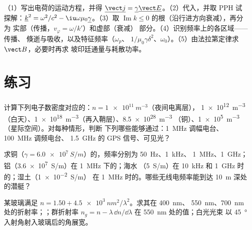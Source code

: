 \begin{method}[介质中的波]\label{met:b2:waves-in-media:method}
（1）写出电荷的运动方程，并得 $\underline{\vect j} =
\underline\gamma\underline{\vect E}$。（2）代入，并取 PPH
试探解：$\underline k^2 = \omega^2/c^2 - \iu\omega\mu_0\underline\gamma$。（3）取
$\operatorname{Im}k \le 0$ 的根（沿行进方向衰减），再分为
实部（传播，$v_\varphi = \omega/k'$）和虚部（衰减）
部分。（4）识别频率上的各区域——传播、
倏逝与吸收，以及特征频率（$\omega_p$、
$1/\mu_0\gamma\delta^2$、$\omega_0$）。（5）由法拉第定律求 $\vect B$，必要时再求
坡印廷通量与耗散功率。
\end{method}

\section{练习}

\begin{exercise}[$\star$]\label{exo:b2:waves-in-media:1}
计算下列电子数密度对应的：$n = \qty{1e11}{m^{-3}}$（夜间电离层），
\qty{1e12}{m^{-3}}（白天）、\qty{1e18}{m^{-3}}（再入鞘层）、\qty{8.5e28}{m^{-3}}
（铜）、\qty{1e5}{m^{-3}}（星际空间）。对每种情形，判断
下列哪些能够通过：\qty{1}{MHz} 调幅电台、\qty{100}{MHz} 调频电台、
\qty{1.5}{GHz} 的 GPS 信号、可见光？
\end{exercise}

\begin{exercise}[$\star$]\label{exo:b2:waves-in-media:2}
求铜（$\gamma = \qty{6.0e7}{S/m}$）的，频率分别为 \qty{50}{Hz}、\qty{1}{kHz}、
\qty{1}{MHz}、\qty{1}{GHz}；铝（\qty{3.6e7}{S/m}）在 \qty{1}{MHz} 下的；海水
（\qty{5}{S/m}）在 \qty{10}{kHz} 和 \qty{1}{GHz} 时的；湿土（\qty{1e-2}{S/m}）
在 \qty{1}{MHz} 时的。哪些无线电频率能到达 \qty{10}{m} 深处的潜艇？
\end{exercise}

\begin{exercise}[$\star$]\label{exo:b2:waves-in-media:3}
某玻璃满足 $n = 1.50 + \qty{4.5e3}{nm^2}/\lambda^2$。求其在 \qty{400}{nm}、
\qty{550}{nm}、\qty{700}{nm} 处的折射率；；群折射率 $n_g = n -
\lambda\,\dd n/\dd\lambda$ 在 \qty{550}{nm} 处的值；白光光束
以 \qty{45}{\degree} 入射角射入玻璃后的角展宽。
\end{exercise}

